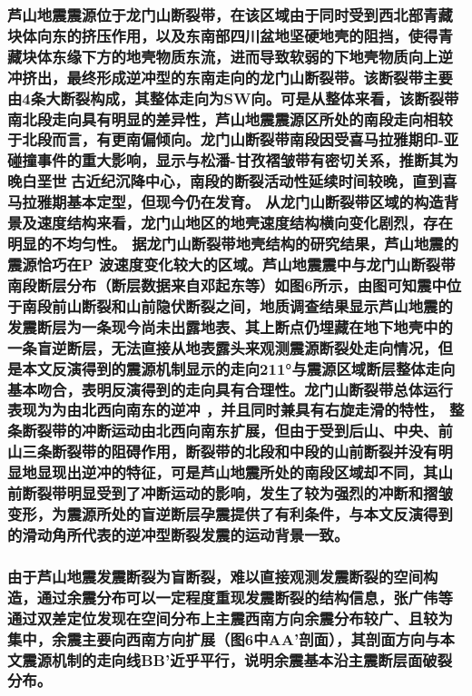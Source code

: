 \documentclass[a4paper,12pt,single,pdftex]{scrartcl}
\begin{document}
\label{ID_411413530}\subsubsection{芦山地震震源位于龙门山断裂带，在该区域由于同时受到西北部青藏块体向东的挤压作用，以及东南部四川盆地坚硬地壳的阻挡，使得青藏块体东缘下方的地壳物质东流，进而导致软弱的下地壳物质向上逆冲挤出，最终形成逆冲型的东南走向的龙门山断裂带\cite{Zhang2013}。该断裂带主要由4条大断裂构成\cite{邓起东1994,李智武2008}，其整体走向为SW向。可是从整体来看，该断裂带南北段走向具有明显的差异性\cite{郭正吾1996,Jia2006,Arne1997,邓康龄2007}，芦山地震震源区所处的南段走向相较于北段而言，有更南偏倾向。龙门山断裂带南段因受喜马拉雅期印-亚碰撞事件的重大影响，显示与松潘-甘孜褶皱带有密切关系，推断其为晚白垩世古近纪沉降中心，南段的断裂活动性延续时间较晚，直到喜马拉雅期基本定型，但现今仍在发育\cite{李智武2008}。
从龙门山断裂带区域的构造背景及速度结构来看，龙门山地区的地壳速度结构横向变化剧烈，存在明显的不均匀性\cite{Zhang2013,Wang2010,张忠杰2009,雷建设2009,Zhang2011}。 据龙门山断裂带地壳结构的研究结果\cite{雷建设2009}，芦山地震的震源恰巧在P 波速度变化较大的区域。芦山地震震中与龙门山断裂带南段断层分布（断层数据来自邓起东等\cite{邓起东2002}）如图6所示，由图可知震中位于南段前山断裂和山前隐伏断裂之间，地质调查结果\cite{徐锡伟2013,徐锡伟2013a}显示芦山地震的发震断层为一条现今尚未出露地表、其上断点仍埋藏在地下地壳中的一条盲逆断层，无法直接从地表露头来观测震源断裂处走向情况，但是本文反演得到的震源机制显示的走向211°与震源区域断层整体走向基本吻合，表明反演得到的走向具有合理性。龙门山断裂带总体运行表现为为由北西向南东的逆冲 ，并且同时兼具有右旋走滑的特性\cite{唐荣昌1991,李勇2006,Densmore2007,陈国光2007}， 整条断裂带的冲断运动由北西向南东扩展，但由于受到后山、中央、前山三条断裂带的阻碍作用，断裂带的北段和中段的山前断裂并没有明显地显现出逆冲的特征，可是芦山地震所处的南段区域却不同，其山前断裂带明显受到了冲断运动的影响，发生了较为强烈的冲断和摺皱变形，为震源所处的盲逆断层孕震提供了有利条件，与本文反演得到的滑动角所代表的逆冲型断裂发震的运动背景一致。}

\label{ID_1585639519}\subsubsection{由于芦山地震发震断裂为盲断裂，难以直接观测发震断裂的空间构造，通过余震分布可以一定程度重现发震断裂的结构信息，张广伟等\cite{张广伟2013}通过双差定位发现在空间分布上主震西南方向余震分布较广、且较为集中，余震主要向西南方向扩展（图6中AA'剖面），其剖面方向与本文震源机制的走向线BB'近乎平行，说明余震基本沿主震断层面破裂分布。}
\end{document}
